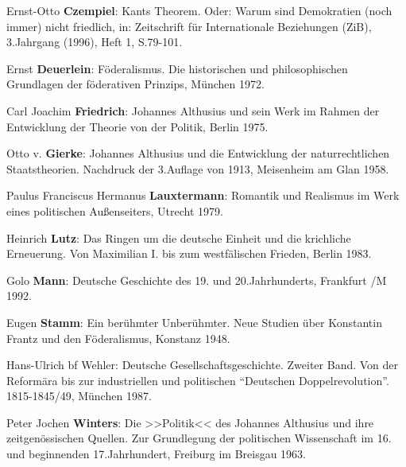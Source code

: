 \documentclass[a4paper,12pt]{article}
\begin{document}
\begin{thebibliography}{99}
 Ernst-Otto {\bf Czempiel}: Kants Theorem. Oder:
Warum sind Demokratien (noch immer) nicht friedlich, in:
Zeitschrift für Internationale Beziehungen (ZiB), 3.Jahrgang
(1996), Heft 1, S.79-101.

 Ernst {\bf Deuerlein}: Föderalismus. Die
historischen und philosophischen Grundlagen der föderativen
Prinzips, München 1972.

 Carl Joachim {\bf Friedrich}: Johannes
Althusius und sein Werk im Rahmen der Entwicklung der Theorie von
der Politik, Berlin 1975.

 Otto v. {\bf Gierke}: Johannes Althusius und die
Entwicklung der naturrechtlichen Staatstheorien. Nachdruck der
3.Auflage von 1913, Meisenheim am Glan 1958.

 Paulus Franciscus Hermanus {\bf Lauxtermann}:
Romantik und Realismus im Werk eines politischen Außenseiters,
Utrecht 1979.

 Heinrich {\bf Lutz}: Das Ringen um die deutsche
Einheit und die krichliche Erneuerung. Von Maximilian I. bis zum
westfälischen Frieden, Berlin 1983.

 Golo {\bf Mann}: Deutsche Geschichte des
19. und 20.Jahrhunderts, Frankfurt /M 1992.

 Eugen {\bf Stamm}: Ein berühmter Unberühmter. Neue
Studien über Konstantin Frantz und den Föderalismus, Konstanz 1948.

 Hans-Ulrich {bf Wehler}: Deutsche
Gesellschaftsgeschichte. Zweiter Band. Von der Reformära bis zur
industriellen und politischen "`Deutschen
Doppelrevolution"'. 1815-1845/49, München 1987.

 Peter Jochen {\bf Winters}: Die >>Politik<< des
Johannes Althusius und ihre zeitgenössischen Quellen. Zur
Grundlegung der politischen Wissenschaft im 16. und beginnenden
17.Jahrhundert, Freiburg im Breisgau 1963.

\end{thebibliography}
\end{document}
